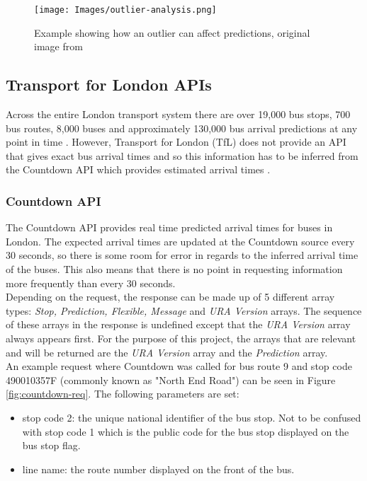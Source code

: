 \begin{figure}[H]
\begin{center}
    \texttt{[image: Images/outlier-analysis.png]}
    \caption{Example showing how an outlier can affect predictions, original image from \cite{forecasting-book}}
    \label{fig:outlier}
\end{center}
\end{figure}

\subsection{Transport for London APIs}
\label{section:tfl-api}

Across the entire London transport system there are over 19,000 bus stops, 700 bus routes, 8,000 buses and approximately 130,000 bus arrival predictions at any point in time \cite{tfl-bus-documentation}. However, Transport for London (TfL) does not provide an API that gives exact bus arrival times and so this information has to be inferred from the Countdown API which provides estimated arrival times \cite{tfl-api}.

\subsubsection{Countdown API}

The Countdown API provides real time predicted arrival times for buses in London. The expected arrival times are updated at the Countdown source every 30 seconds, so there is some room for error in regards to the inferred arrival time of the buses. This also means that there is no point in requesting information more frequently than every 30 seconds. \\

Depending on the request, the response can be made up of 5 different array types: \textit{Stop, Prediction, Flexible, Message} and \textit{URA Version} arrays. The sequence of these arrays in the response is undefined except that the \textit{URA Version} array always appears first. For the purpose of this project, the arrays that are relevant and will be returned are the \textit{URA Version} array and the \textit{Prediction} array. \\

An example request where Countdown was called for bus route 9 and stop code 490010357F (commonly known as "North End Road") can be seen in Figure \ref{fig:countdown-req}. The following parameters are set: 
\begin{itemize}
    \item stop code 2: the unique national identifier of the bus stop. Not to be confused with stop code 1 which is the public code for the bus stop displayed on the bus stop flag.
    \item line name: the route number displayed on the front of the bus.
\end{itemize}

